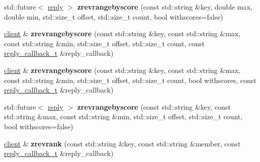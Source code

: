 \begin{DoxyCompactItemize}
\item 
\mbox{\label{classcpp__redis_1_1client_a80a36b6a67feb25b8b89712648c1085d}} 
std\+::future$<$ \mbox{\hyperlink{classcpp__redis_1_1reply}{reply}} $>$ {\bfseries zrevrangebyscore} (const std\+::string \&key, double max, double min, std\+::size\+\_\+t offset, std\+::size\+\_\+t count, bool withscores=false)
\item 
\mbox{\label{classcpp__redis_1_1client_a87288ccafc16ae91a7eb82b1a2cbf1a3}} 
\mbox{\hyperlink{classcpp__redis_1_1client}{client}} \& {\bfseries zrevrangebyscore} (const std\+::string \&key, const std\+::string \&max, const std\+::string \&min, std\+::size\+\_\+t offset, std\+::size\+\_\+t count, const \mbox{\hyperlink{classcpp__redis_1_1client_af7a65eb21aa25230bfbb0b0203c4fc04}{reply\+\_\+callback\+\_\+t}} \&reply\+\_\+callback)
\item 
\mbox{\label{classcpp__redis_1_1client_a82f452e3cc4704d6b8b9bda95c528cd0}} 
\mbox{\hyperlink{classcpp__redis_1_1client}{client}} \& {\bfseries zrevrangebyscore} (const std\+::string \&key, const std\+::string \&max, const std\+::string \&min, std\+::size\+\_\+t offset, std\+::size\+\_\+t count, bool withscores, const \mbox{\hyperlink{classcpp__redis_1_1client_af7a65eb21aa25230bfbb0b0203c4fc04}{reply\+\_\+callback\+\_\+t}} \&reply\+\_\+callback)
\item 
\mbox{\label{classcpp__redis_1_1client_a9cec46926423f6c7ff3a131443de424f}} 
std\+::future$<$ \mbox{\hyperlink{classcpp__redis_1_1reply}{reply}} $>$ {\bfseries zrevrangebyscore} (const std\+::string \&key, const std\+::string \&max, const std\+::string \&min, std\+::size\+\_\+t offset, std\+::size\+\_\+t count, bool withscores=false)
\item 
\mbox{\label{classcpp__redis_1_1client_a459f90ba39d9f9e90df5b756ec25db8b}} 
\mbox{\hyperlink{classcpp__redis_1_1client}{client}} \& {\bfseries zrevrank} (const std\+::string \&key, const std\+::string \&member, const \mbox{\hyperlink{classcpp__redis_1_1client_af7a65eb21aa25230bfbb0b0203c4fc04}{reply\+\_\+callback\+\_\+t}} \&reply\+\_\+callback)
\item 
\mbox{\label{classcpp__redis_1_1client_a9870e21048277805b5eac2ce710089a0}} 

\end{DoxyCompactItemize}
